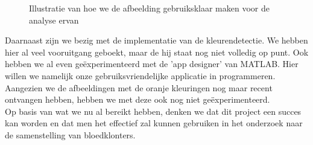 \documentclass[a4paper,kulak]{kulakarticle}
\begin{document}
\begin{figure}[H]
	\centering
	\qquad
	
	\caption{Illustratie van hoe we de afbeelding gebruiksklaar maken voor de analyse ervan}
	\label{fig: voorna}
\end{figure}


Daarnaast zijn we bezig met de implementatie van de kleurendetectie. We hebben hier al veel vooruitgang geboekt, maar de hij staat nog niet volledig op punt. Ook hebben we al even geëxperimenteerd met de 'app designer' van MATLAB. Hier willen we namelijk onze gebruiksvriendelijke applicatie in programmeren.\\
Aangezien we de afbeeldingen met de oranje kleuringen nog maar recent ontvangen hebben, hebben we met deze ook nog niet geëxperimenteerd.\\
Op basis van wat we nu al bereikt hebben, denken we dat dit project een succes kan worden en dat men het effectief zal kunnen gebruiken in het onderzoek naar de samenstelling van bloedklonters.
\end{document}
